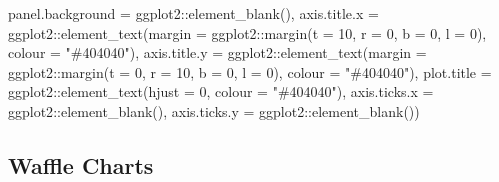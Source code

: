 \documentclass[
]{book}
\newenvironment{Shaded}{\begin{snugshade}}{\end{snugshade}}
\newcommand{\AttributeTok}[1]{\textcolor[rgb]{0.77,0.63,0.00}{#1}}
\newcommand{\DecValTok}[1]{\textcolor[rgb]{0.00,0.00,0.81}{#1}}
\newcommand{\FunctionTok}[1]{\textcolor[rgb]{0.00,0.00,0.00}{#1}}
\newcommand{\NormalTok}[1]{#1}
\newcommand{\SpecialCharTok}[1]{\textcolor[rgb]{0.00,0.00,0.00}{#1}}
\newcommand{\StringTok}[1]{\textcolor[rgb]{0.31,0.60,0.02}{#1}}
\begin{document}
\begin{Shaded}
\begin{Highlighting}[]
               \AttributeTok{panel.background =}\NormalTok{ ggplot2}\SpecialCharTok{::}\FunctionTok{element\_blank}\NormalTok{(),}
               \AttributeTok{axis.title.x =}\NormalTok{ ggplot2}\SpecialCharTok{::}\FunctionTok{element\_text}\NormalTok{(}\AttributeTok{margin =}\NormalTok{ ggplot2}\SpecialCharTok{::}\FunctionTok{margin}\NormalTok{(}\AttributeTok{t =} \DecValTok{10}\NormalTok{, }\AttributeTok{r =} \DecValTok{0}\NormalTok{, }\AttributeTok{b =} \DecValTok{0}\NormalTok{, }\AttributeTok{l =} \DecValTok{0}\NormalTok{), }\AttributeTok{colour =} \StringTok{"\#404040"}\NormalTok{),}
               \AttributeTok{axis.title.y =}\NormalTok{ ggplot2}\SpecialCharTok{::}\FunctionTok{element\_text}\NormalTok{(}\AttributeTok{margin =}\NormalTok{ ggplot2}\SpecialCharTok{::}\FunctionTok{margin}\NormalTok{(}\AttributeTok{t =} \DecValTok{0}\NormalTok{, }\AttributeTok{r =} \DecValTok{10}\NormalTok{, }\AttributeTok{b =} \DecValTok{0}\NormalTok{, }\AttributeTok{l =} \DecValTok{0}\NormalTok{), }\AttributeTok{colour =} \StringTok{"\#404040"}\NormalTok{),}
               \AttributeTok{plot.title =}\NormalTok{ ggplot2}\SpecialCharTok{::}\FunctionTok{element\_text}\NormalTok{(}\AttributeTok{hjust =} \DecValTok{0}\NormalTok{, }\AttributeTok{colour =} \StringTok{"\#404040"}\NormalTok{),}
               \AttributeTok{axis.ticks.x =}\NormalTok{ ggplot2}\SpecialCharTok{::}\FunctionTok{element\_blank}\NormalTok{(),}
               \AttributeTok{axis.ticks.y =}\NormalTok{ ggplot2}\SpecialCharTok{::}\FunctionTok{element\_blank}\NormalTok{())}
\end{Highlighting}
\end{Shaded}

\hypertarget{waffle-charts-1}{%
\subsection{Waffle Charts}\label{waffle-charts-1}}
\end{document}
